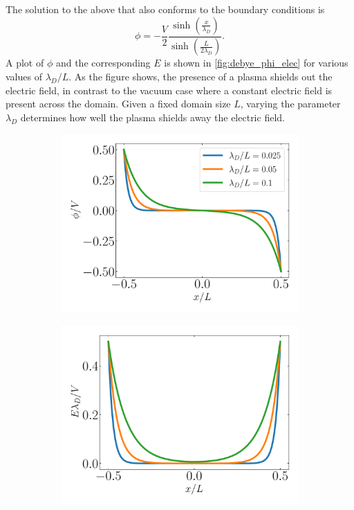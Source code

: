 \documentclass[a4paper,11pt]{report}
\begin{document}
The solution to the above that also conforms to the boundary conditions is
\begin{equation}
    \label{eq:debye_phi_sol}
    \phi = -\frac{V}{2} \frac{\sinh \left (\frac{x}{\lambda_D} \right )}{\sinh \left ( \frac{L}{2\lambda_D} \right )}.
\end{equation}
A plot of $\phi$ and the corresponding $E$ is shown in \cref{fig:debye_phi_elec} for various values of $\lambda_D/L$. As the figure shows, the presence of a plasma shields out the electric field, in contrast to the vacuum case where a constant electric field is present across the domain. Given a fixed domain size $L$, varying the parameter $\lambda_D$ determines how well the plasma shields away the electric field. 
\begin{figure}
    \centering
    \begin{subfigure}[b]{0.45\textwidth}
        \centering
        \includegraphics[width=\textwidth]{../../images/debye_phi.pdf}
        \caption{}
        \label{fig:debye_phi}
    \end{subfigure}
    \begin{subfigure}[b]{0.45\textwidth}
        \centering
        \includegraphics[width=\textwidth]{../../images/debye_elec.pdf}

\end{subfigure}
\end{figure}
\end{document}
